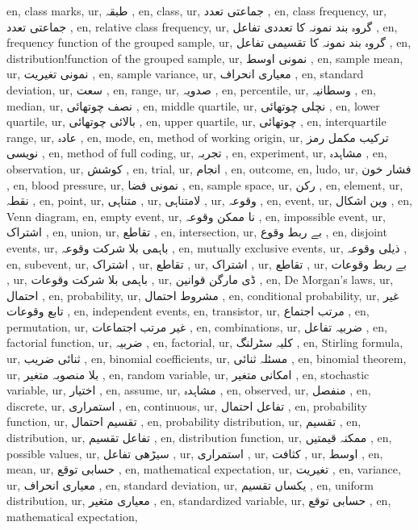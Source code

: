 en, class marks,
ur, طبقہ ,
en, class,
ur, جماعتی تعدد ,
en, class frequency,
ur,  جماعتی تعدد ,
en, relative class frequency,
ur, گروہ بند نمونہ کا تعددی تفاعل ,
en, frequency function of the grouped sample,
ur, گروہ بند نمونہ کا تقسیمی تفاعل ,
en, distribution!function of the grouped sample,
ur, نمونی اوسط ,
en, sample mean,
ur, نمونی تغیریت ,
en, sample variance,
ur, معیاری انحراف ,
en, standard deviation,
ur, سعت ,
en, range,
ur, صدویہ ,
en, percentile,
ur, وسطانیہ ,
en, median,
ur, نصف چوتھائی ,
en, middle quartile,
ur, نچلی چوتھائی ,
en, lower quartile,
ur, بالائی چوتھائی ,
en, upper quartile,
ur, چوتھائی  ,
en, interquartile range,
ur, عادہ ,
en, mode,
en, method of working origin,
ur, ترکیب مکمل رمز نویسی ,
en, method of full coding,
ur, تجربہ ,
en, experiment,
ur, مشاہدہ ,
en, observation,
ur, کوشش ,
en, trial,
ur, انجام ,
en, outcome,
en, ludo,
ur, فشار خون ,
en, blood pressure,
ur, نمونی فضا ,
en, sample space,
ur, رکن ,
en, element,
ur, نقطہ ,
en, point,
ur, متناہی ,
ur, لامتناہی ,
ur, وقوعہ ,
en, event,
ur, وین اشکال ,
en, Venn diagram,
en, empty event,
ur, نا ممکن وقوعہ ,
en, impossible event,
ur, اشتراک ,
en, union,
ur, تقاطع ,
en, intersection,
ur, بے ربط وقوع ,
en, disjoint events,
ur, باہمی بلا شرکت وقوعہ ,
en, mutually exclusive events,
ur, ذیلی وقوعہ ,
en, subevent,
ur, اشتراک ,
ur, تقاطع ,
ur, اشتراک ,
ur, تقاطع ,
ur, بے ربط وقوعات ,
ur, باہمی بلا شرکت وقوعات ,
ur, ڈی مارگن قوانین ,
en, De Morgan's laws,
ur, احتمال ,
en, probability,
ur, مشروط احتمال ,
en, conditional probability,
ur, غیر تابع وقوعات ,
en, independent events,
en, transistor,
ur, مرتب اجتماع ,
en, permutation,
ur, غیر مرتب اجتماعات ,
en, combinations,
ur, ضربیہ تفاعل ,
en, factorial function,
ur, ضربیہ  ,
en, factorial,
ur, کلیہ سٹرلنگ ,
en, Stirling formula,
ur, ثنائی ضریب  ,
en, binomial coefficients,
ur, مسئلہ ثنائی ,
en, binomial theorem,
ur, بلا منصوبہ متغیر ,
en, random variable,
ur, امکانی متغیر ,
en, stochastic variable,
ur, اختیار ,
en, assume,
ur, مشاہدہ ,
en, observed,
ur, منفصل ,
en, discrete,
ur, استمراری ,
en, continuous,
ur, تفاعل احتمال ,
en, probability function,
ur, تقسیم احتمال ,
en, probability distribution,
ur, تقسیم ,
en, distribution,
ur, تفاعل تقسیم ,
en, distribution function,
ur, ممکنہ قیمتیں ,
en, possible values,
ur, سیڑھی تفاعل ,
ur, استمراری ,
ur, کثافت ,
ur, اوسط ,
en, mean,
ur, حسابی توقع ,
en, mathematical expectation,
ur, تغیریت ,
en, variance,
ur, معیاری انحراف ,
en, standard deviation,
ur, یکساں تقسیم ,
en, uniform distribution,
ur, معیاری متغیر ,
en, standardized variable,
ur, حسابی توقع ,
en, mathematical expectation,
